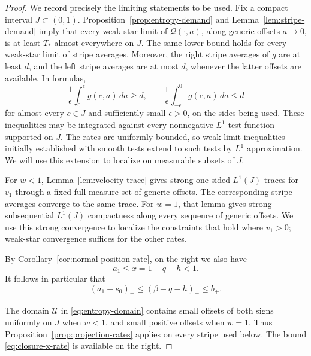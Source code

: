 \begin{proof}
We record precisely the limiting statements to be used.  Fix a compact
interval \(J\subset(0,1)\).  Proposition~\ref{prop:entropy-demand} and
Lemma~\ref{lem:stripe-demand} imply that every weak-star limit of
\(\mathcal Q(\cdot,a)\), along generic offsets \(a\to0\), is at least
\(T_*\) almost everywhere on \(J\).  The same lower bound holds for every
weak-star limit of stripe averages.  Moreover, the right stripe averages
of \(g\) are at least \(d\), and the left stripe averages are at most
\(d\), whenever the latter offsets are available.  In formulas,
\begin{equation}
  \frac1\epsilon\int_0^\epsilon g(c,a)\,da\ge d,
  \qquad
  \frac1\epsilon\int_{-\epsilon}^0 g(c,a)\,da\le d
  \label{eq:closure-stripes}
\end{equation}
for almost every \(c\in J\) and sufficiently small \(\epsilon>0\), on
the sides being used.  These inequalities may be integrated against every
nonnegative \(L^1\) test function supported on \(J\).  The rates are
uniformly bounded, so weak-limit inequalities initially established with
smooth tests extend to such tests by \(L^1\) approximation.  We will use
this extension to localize on measurable subsets of \(J\).

For \(w<1\), Lemma~\ref{lem:velocity-trace} gives strong one-sided
\(L^1(J)\) traces for \(v_1\) through a fixed full-measure set of generic
offsets.  The corresponding stripe averages converge to the same trace.
For \(w=1\), that lemma gives strong subsequential \(L^1(J)\)
compactness along every sequence of generic offsets.  We use this strong
convergence to localize the constraints that hold where \(v_1>0\);
weak-star convergence suffices for the other rates.

By Corollary~\ref{cor:normal-position-rate}, on the right we also have
\begin{equation}
  a_1\le x=1-q-h<1.
  \label{eq:closure-x-rate}
\end{equation}
It follows in particular that
\begin{equation}
  (a_1-s_0)_+\le(\beta-q-h)_+\le b_+.
  \label{eq:closure-extra-rate}
\end{equation}

The domain \(\mathcal U\) in \eqref{eq:entropy-domain} contains small
offsets of both signs uniformly on \(J\) when \(w<1\), and small
positive offsets when \(w=1\).  Thus
Proposition~\ref{prop:projection-rates} applies on every stripe used
below.  The bound \eqref{eq:closure-x-rate} is available on the right.


\end{proof}
